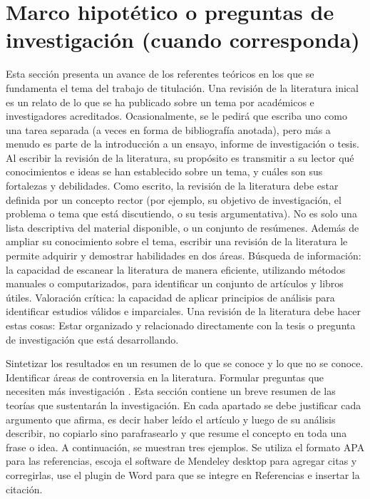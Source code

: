 \documentclass[12pt]{article}
\begin{document}
\section{Marco hipotético o preguntas de investigación (cuando corresponda)}

Esta sección presenta un avance de los referentes teóricos en los que se fundamenta el tema del trabajo de titulación.
Una revisión de la literatura inical es un relato de lo que se ha publicado sobre un tema por académicos e investigadores acreditados. Ocasionalmente, se le pedirá que escriba uno como una tarea separada (a veces en forma de bibliografía anotada), pero más a menudo es parte de la introducción a un ensayo, informe de investigación o tesis. Al escribir la revisión de la literatura, su propósito es transmitir a su lector qué conocimientos e ideas se han establecido sobre un tema, y cuáles son sus fortalezas y debilidades. Como escrito, la revisión de la literatura debe estar definida por un concepto rector (por ejemplo, su objetivo de investigación, el problema o tema que está discutiendo, o su tesis argumentativa). No es solo una lista descriptiva del material disponible, o un conjunto de resúmenes. Además de ampliar su conocimiento sobre el tema, escribir una revisión de la literatura le permite adquirir y demostrar habilidades en dos áreas. Búsqueda de información: la capacidad de escanear la literatura de manera eficiente, utilizando métodos manuales o computarizados, para identificar un conjunto de artículos y libros útiles. Valoración crítica: la capacidad de aplicar principios de análisis para identificar estudios válidos e imparciales. Una revisión de la literatura debe hacer estas cosas: Estar organizado y relacionado directamente con la tesis o pregunta de investigación que está desarrollando. 

Sintetizar los resultados en un resumen de lo que se conoce y lo que no se conoce. Identificar áreas de controversia en la literatura. Formular preguntas que necesiten más investigación .
Esta sección contiene un breve resumen de las teorías que sustentarán la investigación. En cada apartado se debe justificar cada argumento que afirma, es decir haber leído el artículo y luego de su análisis describir, no copiarlo sino parafrasearlo y que resume el concepto en toda una frase o idea. A continuación, se muestran tres ejemplos. Se utiliza el formato APA para las referencias, escoja el software de Mendeley desktop para agregar citas y corregirlas, use el plugin de Word para que se integre en Referencias e insertar la citación.
\end{document}

